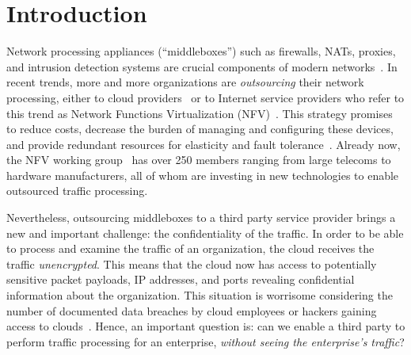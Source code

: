 

\section{Introduction}\label{sec:intro}


    Network processing appliances (``middleboxes'') such as firewalls, NATs, proxies, and intrusion detection systems are crucial components of modern networks~\cite{aplomb}. 
    In recent trends, more and more organizations are {\it outsourcing} their network processing, either to cloud providers~\cite{aplomb, aryaka, zscalar} or to Internet service providers who refer to this trend as Network Functions Virtualization (NFV)~\cite{nfv}.
    This strategy promises to reduce costs, decrease the burden of managing and configuring these devices, and provide redundant resources for elasticity and fault tolerance~\cite{aplomb}.
    Already now, the NFV working group~\cite{nfvwg} has over 250 members ranging from large telecoms to hardware manufacturers, all of whom are investing in new technologies to enable outsourced traffic processing.
   
   Nevertheless, outsourcing middleboxes to a third party service provider brings a new and important challenge: the confidentiality of the traffic. In order to be able to process and examine the traffic of an organization, the cloud  receives  the traffic {\em unencrypted}.  This means that the cloud now has access to potentially sensitive packet payloads,  IP addresses, and ports revealing confidential information about the organization. This situation is worrisome considering the number of documented data breaches by cloud employees or hackers gaining access to clouds~\cite{PrivacyRecords}.
   Hence, an important question is: can we enable a third party to perform traffic processing for an enterprise, {\em without seeing the enterprise's traffic}?
   
   
   

